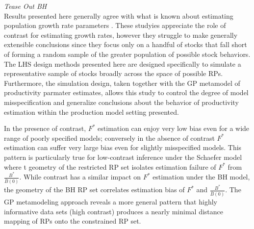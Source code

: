 {\color{blue} {\it Tease Out BH}\\

%
Results presented here generally agree with what is known about estimating population
growth rate parameters \cite{lee_can_2012, conn_when_2010, magnusson_what_2007}.
These studyies appreciate the role of contrast for estimating growth rates,
however they struggle to make generally extensible conclusions since they focus only
on a handful of stocks that fall short of forming a random sample of the greater
population of possible stock behaviors. The LHS design methods presented here are
designed specifically to simulate a representative sample of stocks broadly
across the space of possible RPs. Furthermore, the simulation design, taken together
with the GP metamodel of productivity parmater estimates, allows this study to control
the degree of model misspecification and generalize conclusions about the behavior
of productivity estimation within the production model setting presented.


%
In the presence of contrast, $F^*$ estimation can enjoy very low bias even
for a wide range of poorly specified models; conversely in the absence of contrast
$F^*$ estimation can suffer very large bias even for slightly misspecified models.
This pattern is particularly true for low-contrast inference under the Schaefer model where t
geometry of the restricted RP set isolates estimation failure of $F^*$ from
$\frac{B^*}{\bar B(0)}$. While contrast has a similar impact on $F^*$ estimation
under the BH model, the geometry of the BH RP set correlates estimation bias
of $F^*$ and $\frac{B^*}{\bar B(0)}$. The GP metamodeling approach reveals a
more general pattern that highly informative data sets (high contrast)
produces a nearly minimal distance mapping of RPs %
onto the constrained RP set.

}
